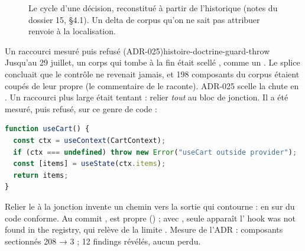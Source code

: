 \begin{figure}[htbp]\centering
{}
\caption{Le cycle d'une décision, reconstitué à partir de l'historique (notes du dossier 15, §4.1). Un delta de corpus qu'on ne sait pas attribuer renvoie à la localisation.}
\label{fig:histoire-cycle}
\end{figure}

\begin{exemple}{Un raccourci mesuré puis refusé (ADR-025)}{histoire-doctrine-guard-throw}
Jusqu'au 29 juillet, un corps qui \og tombe\fg{} à la fin était scellé , comme un . Le splice concluait que le contrôle ne revenait jamais, et 198 composants du corpus étaient coupés de leur propre  (le commentaire de  le raconte). ADR-025 scelle la chute en . Un raccourci plus large était tentant : relier \emph{tout}  au bloc de jonction. Il a été mesuré, puis refusé, sur ce genre de code :
\begin{lstlisting}[language=TypeScript,caption={\file{/tmp/ch26/ex4.tsx} (extrait)}]
function useCart() {
  const ctx = useContext(CartContext);
  if (ctx === undefined) throw new Error("useCart outside provider");
  const [items] = useState(ctx.items);
  return items;
}
\end{lstlisting}
Relier le  à la jonction invente un chemin vers la sortie qui contourne  :  en \Error{} sur du code conforme. Au commit ,  est propre () ; avec , seule apparaît l'\Info{} \og hook  was not found in the registry\fg{}, qui relève de la limite . Mesure de l'ADR : composants sectionnés 208 → 3 ; 12 findings révélés, aucun perdu.
\end{exemple}


